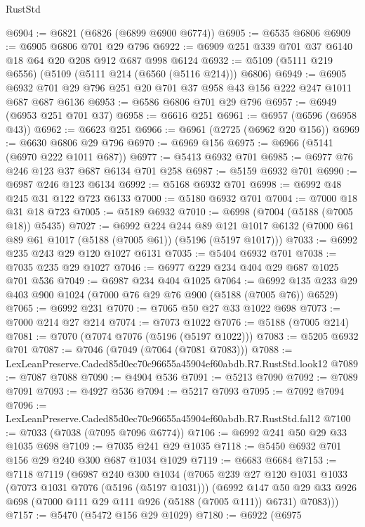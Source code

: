 \begin{lexlean}{RustStd}
\begin{coremodule}
@6904 := @6821 (@6826 (@6899 @6900 @6774))
@6905 := @6535 @6806
@6909 := @6905 @6806 @701 @29 @796
@6922 := @6909 @251 @339 @701 @37 @6140 @18 @64 @20 @208 @912 @687 @998 @6124
@6932 := @5109 (@5111 @219 @6556) (@5109 (@5111 @214 (@6560 (@5116 @214))) @6806)
@6949 := @6905 @6932 @701 @29 @796 @251 @20 @701 @37 @958 @43 @156 @222 @247 @1011 @687 @687 @6136
@6953 := @6586 @6806 @701 @29 @796
@6957 := @6949 (@6953 @251 @701 @37)
@6958 := @6616 @251
@6961 := @6957 (@6596 (@6958 @43))
@6962 := @6623 @251
@6966 := @6961 (@2725 (@6962 @20 @156))
@6969 := @6630 @6806 @29 @796
@6970 := @6969 @156
@6975 := @6966 (@5141 (@6970 @222 @1011 @687))
@6977 := @5413 @6932 @701
@6985 := @6977 @76 @246 @123 @37 @687 @6134 @701 @258
@6987 := @5159 @6932 @701
@6990 := @6987 @246 @123 @6134
@6992 := @5168 @6932 @701
@6998 := @6992 @48 @245 @31 @122 @723 @6133
@7000 := @5180 @6932 @701
@7004 := @7000 @18 @31 @18 @723
@7005 := @5189 @6932
@7010 := @6998 (@7004 (@5188 (@7005 @18)) @5435)
@7027 := @6992
    @224
    @244
    @89
    @121
    @1017
    @6132
    (@7000 @61 @89 @61 @1017 (@5188 (@7005 @61)) (@5196 (@5197 @1017)))
@7033 := @6992 @235 @243 @29 @120 @1027 @6131
@7035 := @5404 @6932 @701
@7038 := @7035 @235 @29 @1027
@7046 := @6977 @229 @234 @404 @29 @687 @1025 @701 @536
@7049 := @6987 @234 @404 @1025
@7064 := @6992 @135 @233 @29 @403 @900 @1024 (@7000 @76 @29 @76 @900 (@5188 (@7005 @76)) @6529)
@7065 := @6992 @231
@7070 := @7065 @50 @27 @33 @1022 @698
@7073 := @7000 @214 @27 @214
@7074 := @7073 @1022
@7076 := @5188 (@7005 @214)
@7081 := @7070 (@7074 @7076 (@5196 (@5197 @1022)))
@7083 := @5205 @6932 @701
@7087 := @7046 (@7049 (@7064 (@7081 @7083)))
@7088 := LexLeanPreserve.Caded85d0ec70c96655a45904ef60abdb.R7.RustStd.look12
@7089 := @7087 @7088
@7090 := @4904 @536
@7091 := @5213 @7090
@7092 := @7089 @7091
@7093 := @4927 @536
@7094 := @5217 @7093
@7095 := @7092 @7094
@7096 := LexLeanPreserve.Caded85d0ec70c96655a45904ef60abdb.R7.RustStd.fal12
@7100 := @7033 (@7038 (@7095 @7096 @6774))
@7106 := @6992 @241 @50 @29 @33 @1035 @698
@7109 := @7035 @241 @29 @1035
@7118 := @5450 @6932 @701 @156 @29 @240 @300 @687 @1034 @1029
@7119 := @6683 @6684
@7153 := @7118
    @7119
    (@6987
      @240
      @300
      @1034
      (@7065
        @239
        @27
        @120
        @1031
        @1033
        (@7073 @1031 @7076 (@5196 (@5197 @1031)))
        (@6992
          @147
          @50
          @29
          @33
          @926
          @698
          (@7000 @111 @29 @111 @926 (@5188 (@7005 @111)) @6731)
          @7083)))
@7157 := @5470 (@5472 @156 @29 @1029)
@7180 := @6922
    (@6975

\end{coremodule}
\end{lexlean}
